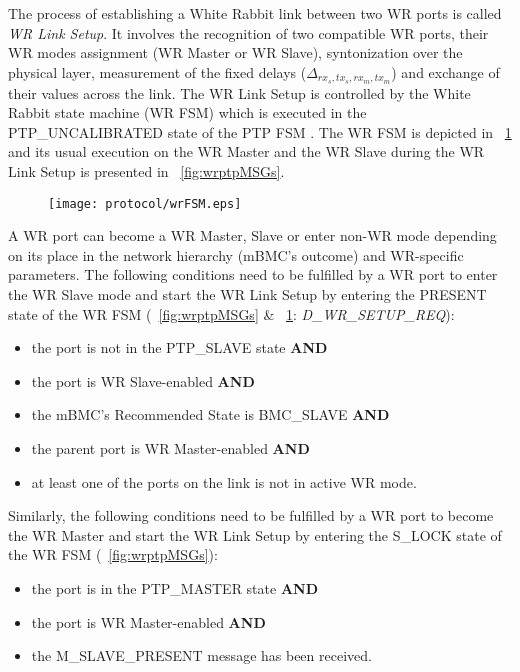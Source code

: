 The process of establishing a White Rabbit link between two WR ports
is called \textit{WR Link Setup}. It involves the
recognition of two compatible WR ports, their WR modes assignment
(WR Master or WR Slave), syntonization over the physical layer, 
measurement of the fixed delays ($\Delta_{rx_s,tx_s,rx_m,tx_m}$) and 
exchange of their values across the link. The WR Link Setup is controlled by the
White Rabbit state machine (WR FSM) which is executed in the PTP\_UNCALIBRATED 
state of the PTP FSM . 
The WR FSM is depicted in \figurename~\ref{fig:wrFSM} and 
its usual execution on the WR Master and the WR Slave during the WR Link Setup is
presented in \figurename~\ref{fig:wrptpMSGs}.
\begin{figure}[!t]
\centering
\texttt{[image: protocol/wrFSM.eps]}
\caption{}
\label{fig:wrFSM}
\end{figure}

A WR port can become a WR Master, Slave or enter non-WR mode depending on its 
place in the network hierarchy (mBMC's outcome) and WR-specific parameters. 
The following conditions need to be fulfilled by a WR port 
to enter the WR Slave mode and start the WR Link Setup by entering the PRESENT state of the WR FSM
(\figurename~\ref{fig:wrptpMSGs} \& \figurename~\ref{fig:wrFSM}: \textit{D\_WR\_SETUP\_REQ}):
\begin{itemize}
\item the port is not in the PTP\_SLAVE state \textbf{AND}
\item the port is WR Slave-enabled \textbf{AND}
\item the mBMC's Recommended State is BMC\_SLAVE \textbf{AND}
\item the parent port is WR Master-enabled \textbf{AND}
\item at least one of the ports on the link is not in active WR mode.
\end{itemize}
Similarly, the following conditions need to be fulfilled by a WR port 
to become the WR Master and start the WR Link Setup by entering the S\_LOCK state of the WR FSM
(\figurename~\ref{fig:wrptpMSGs}):
\begin{itemize}
\item the port is in the PTP\_MASTER state \textbf{AND}
\item the port is WR Master-enabled \textbf{AND}
\item the M\_SLAVE\_PRESENT message has been received.
\end{itemize}

